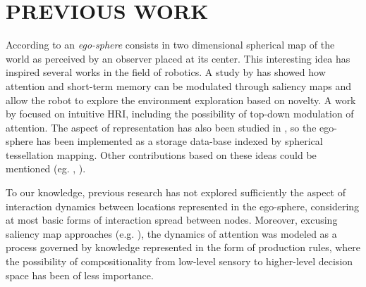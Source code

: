 \documentclass[letterpaper, 10 pt, conference]{ieeeconf}  %
\begin{document}
	
	
	\section{PREVIOUS WORK}
	\label{sec:previous}
	

	According to \cite{albus1991} an \textit{ego-sphere} consists in two dimensional spherical map of the world as perceived by an observer placed at its center. This interesting idea has inspired several works in the field of robotics. A study by \cite{ruesch2008} has showed how attention and short-term memory can be modulated through saliency maps and allow the robot to explore the environment exploration based on novelty. A work by \cite{bodiroza2011} focused on intuitive HRI, including the possibility of top-down modulation of attention. The aspect of representation has also been studied in \cite{peters2009sensory}, so the ego-sphere has been implemented as a storage data-base indexed by spherical tessellation mapping. Other contributions based on these ideas could be mentioned (eg. \cite{grotz2017}, \cite{marques2022}).
	
	
	To our knowledge, previous research has not explored sufficiently the aspect of interaction dynamics between locations represented in the ego-sphere, considering at most basic forms of interaction spread between nodes. Moreover, excusing saliency map approaches (e.g. \cite{ruesch2008}), the dynamics of attention was modeled as a process governed by knowledge represented in the form of production rules, where the possibility of compositionality from low-level sensory to higher-level decision space has been of less importance. 
	 
	
	
\end{document}
